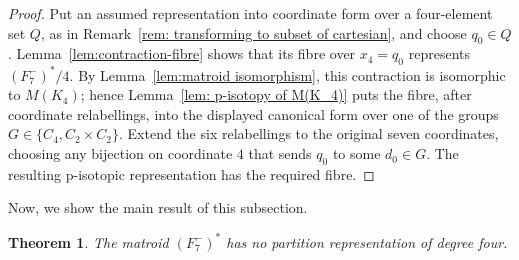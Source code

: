 \documentclass[preprint,12pt]{elsarticle}
\newtheorem{theorem}{Theorem}[section]
\theoremstyle{definition}
\begin{document}
\begin{proof}
Put an assumed representation into coordinate form over a four-element
set $Q$, as in Remark~\ref{rem: transforming to subset of cartesian}, and choose
$q_0\in Q$. Lemma~\ref{lem:contraction-fibre} shows that its fibre over
$x_4=q_0$ represents $(F_7^-)^*/4$. By Lemma~\ref{lem:matroid isomorphism}, this
contraction is isomorphic to $M(K_4)$; hence Lemma~\ref{lem: p-isotopy of M(K_4)}
puts the fibre, after coordinate relabellings, into the displayed canonical form
over one of the groups $G\in\{C_4,C_2\times C_2\}$. Extend the six relabellings
to the original seven coordinates, choosing any bijection on coordinate $4$ that
sends $q_0$ to some $d_0\in G$. The resulting p-isotopic representation has the
required fibre.
\end{proof}
Now, we show the main result of this subsection.

\begin{theorem}\label{lem:dnf}
The matroid $(F_7^-)^*$ has no partition representation of degree four.
\end{theorem}
\end{document}
